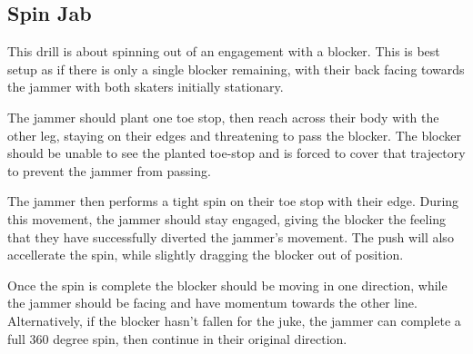 \subsection*{Spin Jab}
\label{drill:last_blocker/spin_jab}

This drill is about spinning out of an engagement with a blocker.
This is best setup as if there is only a single blocker remaining, with their back facing towards the jammer with both skaters initially stationary.  
 
The jammer should plant one toe stop, then reach across their body with the other leg, staying on their edges and threatening to pass the blocker.
The blocker should be unable to see the planted toe-stop and is forced to cover that trajectory to prevent the jammer from passing.

The jammer then performs a tight spin on their toe stop with their edge.
During this movement, the jammer should stay engaged, giving the blocker the feeling that they have successfully diverted the jammer's movement.
The push will also accellerate the spin, while slightly dragging the blocker out of position. 

Once the spin is complete the blocker should be moving in one direction, while the jammer should be facing and have momentum towards the other line.  
Alternatively, if the blocker hasn't fallen for the juke, the jammer can complete a full 360 degree spin, then continue in their original direction. 


